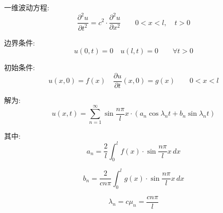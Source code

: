 \documentclass[12pt,a4paper]{article}
\numberwithin{subsection}{section}
\numberwithin{subsubsection}{subsection}
\theoremstyle{plain}
\theoremstyle{definition}
\theoremstyle{remark}
\begin{document}
	一维波动方程:
	\begin{equation}
		\frac{\partial^2 u}{\partial t^2} = c^2 \cdot \frac{\partial^2 u}{\partial x^2} \qquad 0 < x < l, \quad t > 0
	\end{equation}
	
	边界条件:
	\begin{equation}
		u(0, t) = 0 \quad u(l, t) = 0 \qquad \forall t > 0
	\end{equation}
	
	初始条件:
	\begin{equation}
		u(x, 0) = f(x) \quad \frac{\partial u}{\partial t}(x, 0) = g(x) \qquad 0 < x < l
	\end{equation}
	
	解为:
	\begin{equation}
		u(x, t) = \sum_{n=1}^{\infty} \sin \frac{n\pi}{l} x \cdot \left( a_n \cos \lambda_n t + b_n \sin \lambda_n t \right)
	\end{equation}
	
	其中:
	\begin{equation}
		a_n = \frac{2}{l} \int_0^l f(x) \cdot \sin \frac{n\pi}{l} x \, dx
	\end{equation}
	
	\begin{equation}
		b_n = \frac{2}{c n \pi} \int_0^l g(x) \cdot \sin \frac{n\pi}{l} x \, dx
	\end{equation}
	
	\begin{equation}
		\lambda_n = c \mu_n = \frac{c n \pi}{l}
	\end{equation}
	
\end{document}
